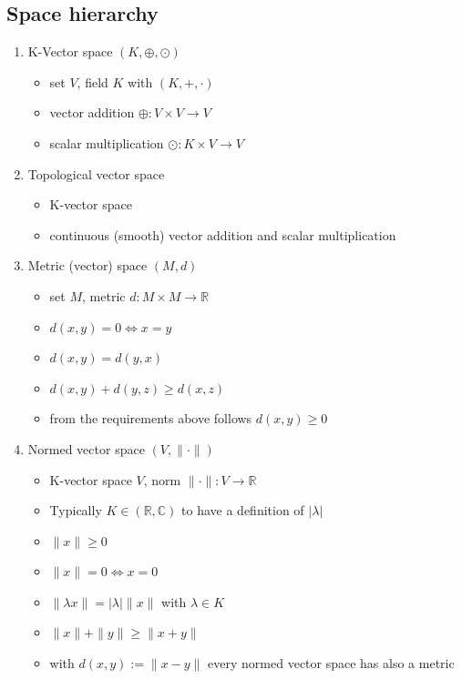 \documentclass[10pt,a4paper]{book}
\theoremstyle{definition}
\begin{document}
\subsection{Space hierarchy}
\begin{enumerate}
    \item K-Vector space $(K,\oplus,\odot)$ 
        \begin{itemize}
            \item set $V$, field $K$ with $(K,+,\cdot)$
            \item vector addition $\oplus: V\times V\rightarrow V$
            \item scalar multiplication $\odot: K\times V\rightarrow V$
        \end{itemize}
    \item Topological vector space
        \begin{itemize}
            \item K-vector space
            \item continuous (smooth) vector addition and scalar multiplication
        \end{itemize}
    \item Metric (vector) space $(M,d)$
        \begin{itemize}
            \item set $M$, metric $d: M\times M\rightarrow \mathbb{R}$
            \item $d(x,y)=0 \Leftrightarrow x=y$
            \item $d(x,y)=d(y,x)$
            \item $d(x,y)+d(y,z) \ge d(x,z)$
            \item from the requirements above follows $d(x,y)\ge0$
        \end{itemize}
    \item Normed vector space $(V,\|\cdot\|)$
        \begin{itemize}
            \item K-vector space $V$, norm $\|\cdot\|: V\rightarrow \mathbb{R}$
            \item Typically $K\in(\mathbb{R}, \mathbb{C})$ to have a definition of $|\lambda|$
            \item $\|x\|\ge0$
            \item $\|x\|=0 \Leftrightarrow x=0$
            \item $\|\lambda x\|=|\lambda| \|x\|$ with $\lambda\in K$
            \item $\|x\|+\|y\|\ge\|x+y\|$
            \item with $d(x,y):=\|x-y\|$ every normed vector space has also a metric

\end{itemize}
\end{enumerate}
\end{document}
